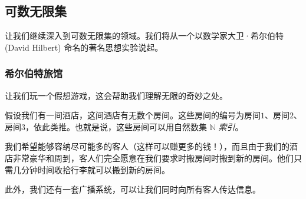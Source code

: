 
\subsection{可数无限集}\label{sec:section7.6.3}

让我们继续深入到可数无限集的领域。我们将从一个以数学家大卫·希尔伯特 (David Hilbert) 命名的著名思想实验说起。

\subsubsection*{希尔伯特旅馆}

让我们玩一个假想游戏，这会帮助我们理解无限的奇妙之处。

假设我们有一间酒店，这间酒店有无数个房间。这些房间的编号为房间$1$、房间$2$、房间$3$，依此类推。也就是说，这些房间可以用自然数集 $\mathbb{N}$ \emph{索引}。

我们希望能够容纳尽可能多的客人（这样可以赚更多的钱！），而且由于我们的酒店非常豪华和周到，客人们完全愿意在我们要求时搬房间时搬到新的房间。他们只需几分钟时间收拾行李就可以搬到新的房间。

此外，我们还有一套广播系统，可以让我们同时向所有客人传达信息。

